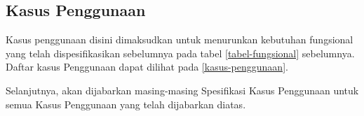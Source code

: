 \subsection{Kasus Penggunaan}
	Kasus penggunaan disini dimaksudkan untuk menurunkan kebutuhan fungsional yang telah dispesifikasikan sebelumnya pada tabel \ref{tabel-fungsional} sebelumnya.\\
	Daftar kasus Penggunaan dapat dilihat pada \ref{kasus-penggunaan}.
	
	  
	Selanjutnya, akan dijabarkan masing-masing Spesifikasi Kasus Penggunaan untuk semua  Kasus Penggunaan yang telah dijabarkan diatas.
	
	
	
	
	
	
	
	
	
	
	
	
	
	
	
	



